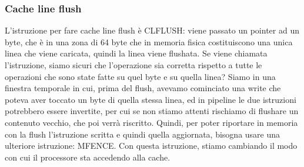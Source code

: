 \documentclass[12pt, oneside]{extbook}
\begin{document}
\subsubsection{Cache line flush}
L'istruzione per fare cache line flush è CLFLUSH: viene passato un pointer ad un byte, che è in una zona di 64 byte che in memoria fisica costituiscono una unica linea che viene caricata, quindi la linea viene flushata. Se viene chiamata l'istruzione, siamo sicuri che l'operazione sia corretta rispetto a tutte le operazioni che sono state fatte su quel byte e su quella linea? Siamo in una finestra temporale in cui, prima del flush, avevamo cominciato una write che poteva aver toccato un byte di quella stessa linea, ed in pipeline le due istruzioni potrebbero essere invertite, per cui se non stiamo attenti rischiamo di flushare un contenuto vecchio, che poi verrà riscritto. Quindi, per poter riportare in memoria con la flush l'istruzione scritta e quindi quella aggiornata, bisogna usare una ulteriore istruzione: MFENCE. Con questa istruzione, stiamo cambiando il modo con cui il processore sta accedendo alla cache.
\end{document}
